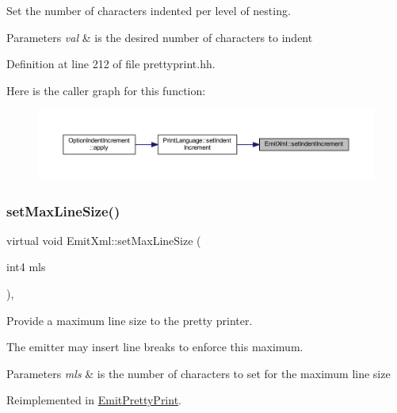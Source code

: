 Set the number of characters indented per level of nesting. 


\begin{DoxyParams}{Parameters}
{\em val} & is the desired number of characters to indent \\
\hline
\end{DoxyParams}


Definition at line 212 of file prettyprint.\+hh.

Here is the caller graph for this function\+:
\nopagebreak
\begin{figure}[H]
\begin{center}
\leavevmode
\includegraphics[width=350pt]{class_emit_xml_a969e2ff4d893610fdb54d6895d7a741f_icgraph}
\end{center}
\end{figure}
\mbox{\label{class_emit_xml_a037f97e86e503c8f2cf61faf5f510ec2}} 
\subsubsection{\texorpdfstring{setMaxLineSize()}{setMaxLineSize()}}
{\footnotesize\ttfamily virtual void Emit\+Xml\+::set\+Max\+Line\+Size (\begin{DoxyParamCaption}\item[{int4}]{mls }\end{DoxyParamCaption})\hspace{0.3cm}{\ttfamily [inline]}, {\ttfamily [virtual]}}



Provide a maximum line size to the pretty printer. 

The emitter may insert line breaks to enforce this maximum. 
\begin{DoxyParams}{Parameters}
{\em mls} & is the number of characters to set for the maximum line size \\
\hline
\end{DoxyParams}


Reimplemented in \mbox{\hyperlink{class_emit_pretty_print_a998863b23c0a4a8e8f8c061453fffaf7}{Emit\+Pretty\+Print}}.



